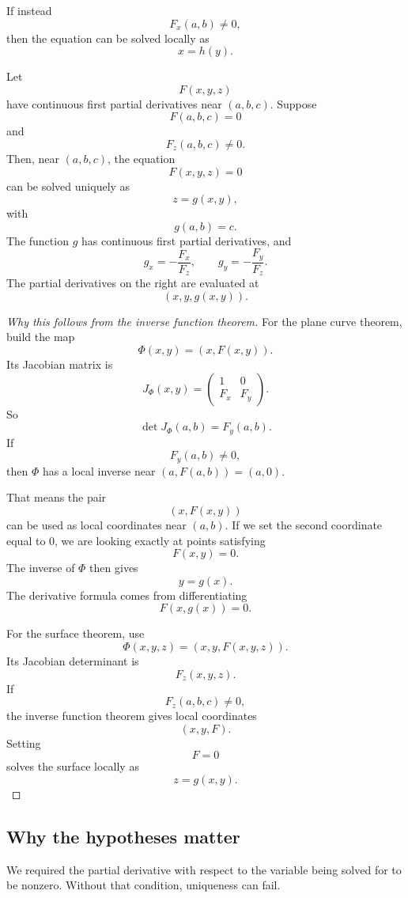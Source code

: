If instead
\[
    F_x(a,b)\ne0,
\]
then the equation can be solved locally as
\[
    x=h(y).
\]

\begin{theorem}
Let
\[
    F(x,y,z)
\]
have continuous first partial derivatives near \((a,b,c)\).  Suppose
\[
    F(a,b,c)=0
\]
and
\[
    F_z(a,b,c)\ne0.
\]
Then, near \((a,b,c)\), the equation
\[
    F(x,y,z)=0
\]
can be solved uniquely as
\[
    z=g(x,y),
\]
with
\[
    g(a,b)=c.
\]
The function \(g\) has continuous first partial derivatives, and
\[
\boxed{
    g_x=-\frac{F_x}{F_z},
    \qquad
    g_y=-\frac{F_y}{F_z}.
}
\]
The partial derivatives on the right are evaluated at
\[
    (x,y,g(x,y)).
\]
\end{theorem}

\begin{proof}[Why this follows from the inverse function theorem]
For the plane curve theorem, build the map
\[
    \Phi(x,y)=(x,F(x,y)).
\]
Its Jacobian matrix is
\[
    J_\Phi(x,y)
    =
    \begin{pmatrix}
        1 & 0\\
        F_x & F_y
    \end{pmatrix}.
\]
So
\[
    \det J_\Phi(a,b)=F_y(a,b).
\]
If
\[
    F_y(a,b)\ne0,
\]
then \(\Phi\) has a local inverse near \((a,F(a,b))=(a,0)\).

That means the pair
\[
    (x,F(x,y))
\]
can be used as local coordinates near \((a,b)\).  If we set the second coordinate equal
to \(0\), we are looking exactly at points satisfying
\[
    F(x,y)=0.
\]
The inverse of \(\Phi\) then gives
\[
    y=g(x).
\]
The derivative formula comes from differentiating
\[
    F(x,g(x))=0.
\]

For the surface theorem, use
\[
    \Phi(x,y,z)=(x,y,F(x,y,z)).
\]
Its Jacobian determinant is
\[
    F_z(x,y,z).
\]
If
\[
    F_z(a,b,c)\ne0,
\]
the inverse function theorem gives local coordinates
\[
    (x,y,F).
\]
Setting
\[
    F=0
\]
solves the surface locally as
\[
    z=g(x,y).
\]
\end{proof}

\subsection{Why the hypotheses matter}

We required the partial derivative with respect to the variable being solved for to be
nonzero.  Without that condition, uniqueness can fail.

